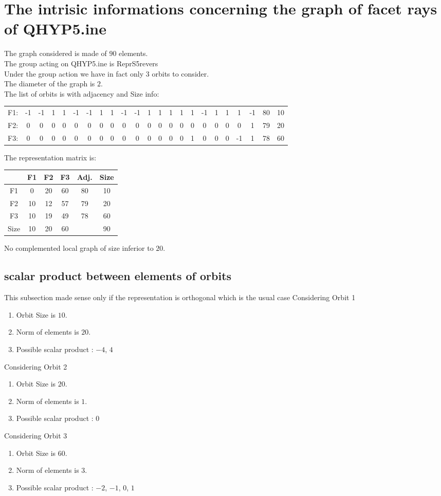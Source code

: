 \documentclass[12pt]{article}
\begin{document}
\section{The intrisic informations concerning the graph of facet rays of QHYP5.ine}
The graph considered is made of $90$ elements.\\
The group acting on QHYP5.ine is ReprS5revers\\
Under the group action we have in fact only $3$ orbits to consider.\\
The diameter of the graph is $2$.\\
The list of orbits is with adjacency and Size info:
\begin{center}
\scriptsize
\begin{tabular}{ccccccccccccccccccccc|c|c}
F1:&-1&-1&1&1&-1&-1&1&1&-1&-1&1&1&1&1&1&-1&1&1&1&-1&80&10\\
F2:&0&0&0&0&0&0&0&0&0&0&0&0&0&0&0&0&0&0&0&1&79&20\\
F3:&0&0&0&0&0&0&0&0&0&0&0&0&0&0&1&0&0&0&-1&1&78&60\\
\end{tabular}
\end{center}
The representation matrix is:
\begin{center}
\scriptsize
\begin{tabular}{|c|ccc|c|c|}
\hline
&F1&F2&F3&Adj.&Size\\
\hline
F1& 0& 20& 60&80&10\\
F2& 10& 12& 57&79&20\\
F3& 10& 19& 49&78&60\\
\hline
Size&10&20&60&&90\\
\hline
\end{tabular}
\end{center}
No complemented local graph of size inferior to $20$.
\subsection{scalar product between elements of orbits}
\noindent This subsection made sense only if the representation is orthogonal which is the usual case
Considering Orbit 1
\begin{enumerate}
\item Orbit Size is $10$.
\item Norm of elements is $20$.
\item Possible scalar product : $-4$, $4$
\end{enumerate}
Considering Orbit 2
\begin{enumerate}
\item Orbit Size is $20$.
\item Norm of elements is $1$.
\item Possible scalar product : $0$
\end{enumerate}
Considering Orbit 3
\begin{enumerate}
\item Orbit Size is $60$.
\item Norm of elements is $3$.
\item Possible scalar product : $-2$, $-1$, $0$, $1$
\end{enumerate}
\end{document}

